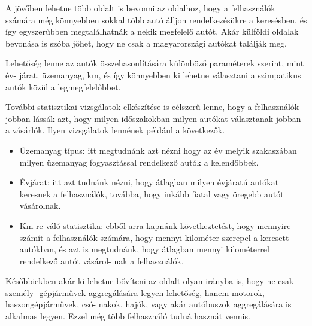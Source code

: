 

A jövőben lehetne több oldalt is bevonni az oldalhoz, hogy a felhasználók számára még könnyebben sokkal több autó álljon rendelkezésükre a keresésben, és így egyszerűbben megtalálhatnák a nekik megfelelő autót. Akár külföldi oldalak bevonása is szóba jöhet, hogy ne csak a magyarországi autókat találják meg.


Lehetőség lenne az autók összehasonlítására különböző paraméterek szerint, mint év-
járat, üzemanyag, km, és így könnyebben ki lehetne választani a szimpatikus autók közül a legmegfelelőbbet.


További statisztikai vizsgálatok elkészítése is célszerű lenne, hogy a felhasználók jobban lássák azt, hogy milyen időszakokban milyen autókat választanak jobban a vásárlók. Ilyen vizsgálatok lennének például a következők.

\begin{itemize}
\item Üzemanyag típus: itt megtudnánk azt nézni hogy az év melyik szakaszában milyen üzemanyag fogyasztással rendelkező autók a kelendőbbek.

\item Évjárat: itt azt tudnánk nézni, hogy átlagban milyen évjáratú autókat keresnek a felhasználók, továbba, hogy inkább fiatal vagy öregebb autót vásárolnak.

\item Km-re váló statisztika: ebből arra kapnánk következtetést, hogy mennyire számít a felhasználók számára, hogy mennyi kilométer szerepel a keresett autókban, és azt is megtudnánk, hogy átlagban mennyi kilométerrel rendelkező autót vásárol-
nak a felhasználók.
\end{itemize}


Későbbiekben akár ki lehetne bővíteni az oldalt olyan irányba is, hogy ne csak személy-
gépjárművek aggregálására legyen lehetőség, hanem motorok, haszongépjárművek, csó-
nakok, hajók, vagy akár autóbuszok aggregálására is alkalmas legyen. Ezzel még több felhasználó tudná hasznát vennis.